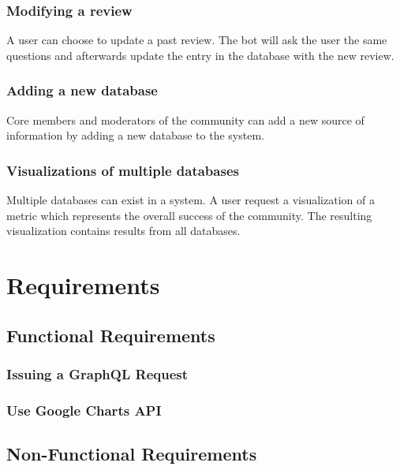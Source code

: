\subsubsection{Modifying a review} A user can choose to update a past review. The bot will ask the user the same questions and afterwards update the entry in the database with the new review.

\subsubsection{Adding a new database} Core members and moderators of the community can add a new source of information by adding a new database to the system.

\subsubsection{Visualizations of multiple databases} Multiple databases can exist in a system. A user request a visualization of a metric which represents the overall success of the community. The resulting visualization contains results from all databases.

\section{Requirements}

\subsection{Functional Requirements}

\subsubsection{Issuing a GraphQL Request}

\subsubsection{Use Google Charts API}

\subsubsection{}

\subsection{Non-Functional Requirements}